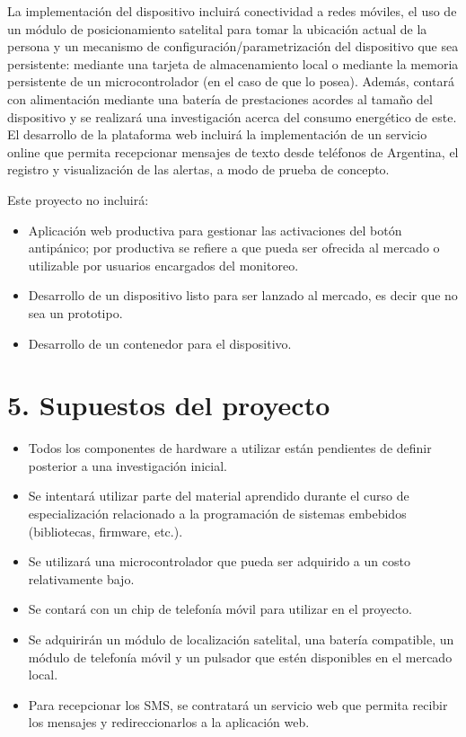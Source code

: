 \documentclass[
11pt, %
]{charter}
\begin{document}
La implementación del dispositivo incluirá conectividad a redes móviles, el uso de un módulo de posicionamiento satelital para tomar la ubicación actual de la persona y un mecanismo de configuración/parametrización del dispositivo que sea persistente: mediante una tarjeta de almacenamiento local o mediante la memoria persistente de un microcontrolador (en el caso de que lo posea). Además, contará con alimentación mediante una batería de prestaciones acordes al tamaño del dispositivo y se realizará una investigación acerca del consumo energético de este.
El desarrollo de la plataforma web incluirá la implementación de un servicio online que permita recepcionar mensajes de texto desde teléfonos de Argentina, el registro y visualización de las alertas, a modo de prueba de concepto.

Este proyecto no incluirá:
\begin{itemize}
	\item Aplicación web productiva para gestionar las activaciones del botón antipánico; por productiva se refiere a que pueda ser ofrecida al mercado o utilizable por usuarios encargados del monitoreo.
	\item Desarrollo de un dispositivo listo para ser lanzado al mercado, es decir que no sea un prototipo.
	\item Desarrollo de un contenedor para el dispositivo.
\end{itemize}

\section{5. Supuestos del proyecto}
\label{sec:supuestos}

\begin{itemize}
	\item Todos los componentes de hardware a utilizar están pendientes de definir posterior a una investigación inicial.
	\item Se intentará utilizar parte del material aprendido durante el curso de especialización relacionado a la programación de sistemas embebidos (bibliotecas, firmware, etc.).
	\item Se utilizará una microcontrolador que pueda ser adquirido a un costo relativamente bajo.
	\item Se contará con un chip de telefonía móvil para utilizar en el proyecto.
	\item Se adquirirán un módulo de localización satelital, una batería compatible, un módulo de telefonía móvil y un pulsador que estén disponibles en el mercado local.
	\item Para recepcionar los SMS, se contratará un servicio web que permita recibir los mensajes y redireccionarlos a la aplicación web.

\end{itemize}
\end{document}
